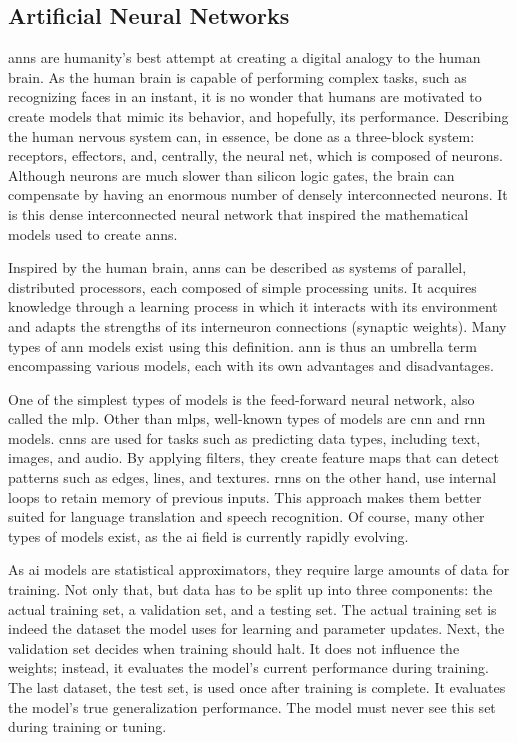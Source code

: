 \subsection{Artificial Neural Networks} \label{subsec:ann}


\gls{ann}s are humanity's best attempt at creating a digital analogy to the human brain.
As the human brain is capable of performing complex tasks, such as recognizing faces in an instant, it is no wonder that humans are motivated to create models that mimic its behavior, and hopefully, its performance.
Describing the human nervous system can, in essence, be done as a three-block system: receptors, effectors, and, centrally, the neural net, which is composed of neurons.
Although neurons are much slower than silicon logic gates, the brain can compensate by having an enormous number of densely interconnected neurons.
It is this dense interconnected neural network that inspired the mathematical models used to create \gls{ann}s.

Inspired by the human brain, \gls{ann}s can be described as systems of parallel, distributed processors, each composed of simple processing units.
It acquires knowledge through a learning process in which it interacts with its environment and adapts the strengths of its interneuron connections (synaptic weights).
Many types of \gls{ann} models exist using this definition. \gls{ann} is thus an umbrella term encompassing various models, each with its own advantages and disadvantages.

One of the simplest types of models is the feed-forward neural network, also called the \gls{mlp}.
Other than \gls{mlp}s, well-known types of models are \gls{cnn} and \gls{rnn} models. \gls{cnn}s are used for tasks such as predicting data types, including text, images, and audio.
By applying filters, they create feature maps that can detect patterns such as edges, lines, and textures. \gls{rnn}s on the other hand, use internal loops to retain memory of previous inputs.
This approach makes them better suited for language translation and speech recognition.
Of course, many other types of models exist, as the \gls{ai} field is currently rapidly evolving.

As \gls{ai} models are statistical approximators, they require large amounts of data for training.
Not only that, but data has to be split up into three components: the actual training set, a validation set, and a testing set.
The actual training set is indeed the dataset the model uses for learning and parameter updates.
Next, the validation set decides when training should halt.
It does not influence the weights; instead, it evaluates the model's current performance during training.
The last dataset, the test set, is used once after training is complete.
It evaluates the model's true generalization performance.
The model must never see this set during training or tuning.

